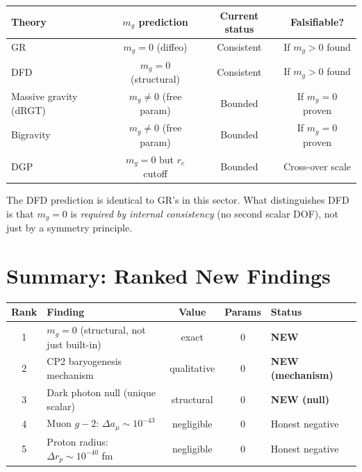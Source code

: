 \documentclass[11pt]{article}
\begin{document}
\begin{center}
\small
\begin{tabular}{lccc}
\toprule
\textbf{Theory} & $m_g$ prediction & Current status & Falsifiable? \\
\midrule
GR & $m_g = 0$ (diffeo) & Consistent & If $m_g > 0$ found \\
DFD & $m_g = 0$ (structural) & Consistent & If $m_g > 0$ found \\
Massive gravity (dRGT) & $m_g \neq 0$ (free param) & Bounded & If $m_g = 0$ proven \\
Bigravity & $m_g \neq 0$ (free param) & Bounded & If $m_g = 0$ proven \\
DGP & $m_g = 0$ but $r_c$ cutoff & Bounded & Cross-over scale \\
\bottomrule
\end{tabular}
\end{center}

The DFD prediction is identical to GR's in this sector.  What
distinguishes DFD is that $m_g = 0$ is \emph{required by internal
consistency} (no second scalar DOF), not just by a symmetry principle.

\section{Summary: Ranked New Findings}
\label{sec:summary}

\begin{center}
\small
\begin{tabular}{clccl}
\toprule
\textbf{Rank} & \textbf{Finding} & \textbf{Value} & \textbf{Params}
& \textbf{Status} \\
\midrule
1 & $m_g = 0$ (structural, not just built-in) & exact & 0 & \textbf{NEW} \\
2 & CP2 baryogenesis mechanism & qualitative & 0 & \textbf{NEW (mechanism)} \\
3 & Dark photon null (unique scalar) & structural & 0 & \textbf{NEW (null)} \\
4 & Muon $g-2$: $\Delta a_\mu \sim 10^{-43}$ & negligible & 0 & Honest negative \\
5 & Proton radius: $\Delta r_p \sim 10^{-40}$ fm & negligible & 0 & Honest negative \\
\bottomrule
\end{tabular}
\end{center}
\end{document}
